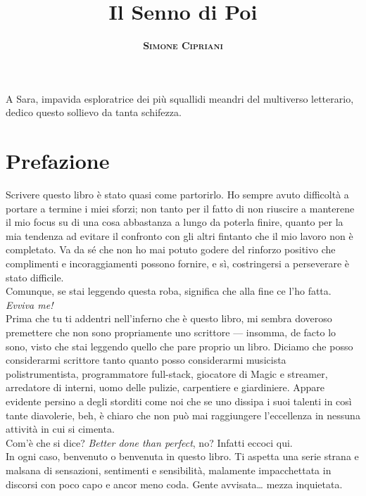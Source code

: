 \documentclass[12pt]{book}
\title{
	\Huge \textbf{Il Senno di Poi}
}
\author{
	\textsc{\textbf{Simone Cipriani}}
}
\newenvironment{dedication} {
	\cleardoublepage\thispagestyle{empty}
	\vspace*{\stretch{1}}
	\hfill\begin{minipage}[t]{0.66\textwidth}
	\raggedright}
{
	\end{minipage}
	\vspace*{\stretch{3}}
	\clearpage
}
\begin{document}
\setlength{\parskip}{0.25em}
\setlength{\parindent}{0.5em}

\frontmatter
\maketitle
\begin{dedication}
	A Sara, impavida esploratrice dei più squallidi meandri del multiverso letterario, dedico questo sollievo da tanta schifezza.
\end{dedication}

\mainmatter\chapter*{Prefazione}

Scrivere questo libro è stato quasi come partorirlo. Ho sempre avuto difficoltà a portare a termine i miei sforzi; non tanto per il fatto di non riuscire a manterene il mio focus su di una cosa abbastanza a lungo da poterla finire, quanto per la mia tendenza ad evitare il confronto con gli altri fintanto che il mio lavoro non è completato. Va da sé che non ho mai potuto godere del rinforzo positivo che complimenti e incoraggiamenti possono fornire, e sì, costringersi a perseverare è stato difficile. \\

Comunque, se stai leggendo questa roba, significa che alla fine ce l'ho fatta. \emph{Evviva me!} \\

Prima che tu ti addentri nell'inferno che è questo libro, mi sembra doveroso premettere che non sono propriamente uno scrittore --- insomma, de facto lo sono, visto che stai leggendo quello che pare proprio un libro. Diciamo che posso considerarmi scrittore tanto quanto posso considerarmi musicista polistrumentista, programmatore full-stack, giocatore di Magic e streamer, arredatore di interni, uomo delle pulizie, carpentiere e giardiniere. Appare evidente persino a degli storditi come noi che se uno dissipa i suoi talenti in così tante diavolerie, beh, è chiaro che non può mai raggiungere l'eccellenza in nessuna attività in cui si cimenta. \\

Com'è che si dice? \emph{Better done than perfect}, no? Infatti eccoci qui. \\

In ogni caso, benvenuto o benvenuta in questo libro. Ti aspetta una serie strana e malsana di sensazioni, sentimenti e sensibilità, malamente impacchettata in discorsi con poco capo e ancor meno coda. Gente avvisata\ldots{} mezza inquietata.
\end{document}

